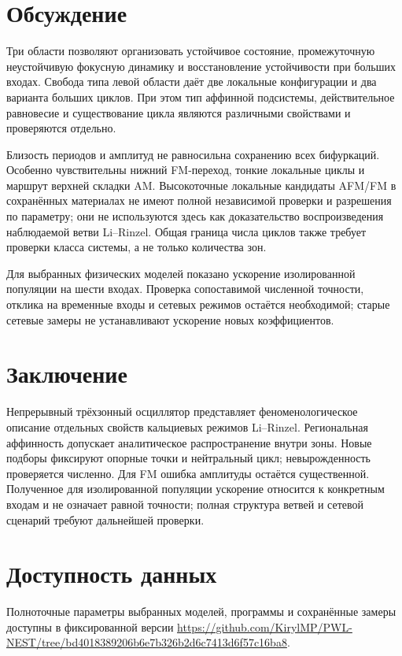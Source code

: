 \section{Обсуждение}
Три области позволяют организовать устойчивое состояние, промежуточную неустойчивую фокусную динамику и восстановление устойчивости при больших входах. Свобода типа левой области даёт две локальные конфигурации и два варианта больших циклов. При этом тип аффинной подсистемы, действительное равновесие и существование цикла являются различными свойствами и проверяются отдельно.

Близость периодов и амплитуд не равносильна сохранению всех бифуркаций. Особенно чувствительны нижний FM-переход, тонкие локальные циклы и маршрут верхней складки AM. Высокоточные локальные кандидаты AFM/FM в сохранённых материалах не имеют полной независимой проверки и разрешения по параметру; они не используются здесь как доказательство воспроизведения наблюдаемой ветви Li--Rinzel. Общая граница числа циклов также требует проверки класса системы, а не только количества зон.

Для выбранных физических моделей показано ускорение изолированной популяции на шести входах. Проверка сопоставимой численной точности, отклика на временные входы и сетевых режимов остаётся необходимой; старые сетевые замеры не устанавливают ускорение новых коэффициентов.

\section{Заключение}
Непрерывный трёхзонный осциллятор представляет феноменологическое описание отдельных свойств кальциевых режимов Li--Rinzel. Региональная аффинность допускает аналитическое распространение внутри зоны. Новые подборы фиксируют опорные точки и нейтральный цикл; невырожденность проверяется численно. Для FM ошибка амплитуды остаётся существенной. Полученное для изолированной популяции ускорение относится к конкретным входам и не означает равной точности; полная структура ветвей и сетевой сценарий требуют дальнейшей проверки.

\section*{Доступность данных}
Полноточные параметры выбранных моделей, программы и сохранённые замеры доступны в фиксированной версии \url{https://github.com/KirylMP/PWL-NEST/tree/bd4018389206b6e7b326b2d6c7413d6f57c16ba8}.

